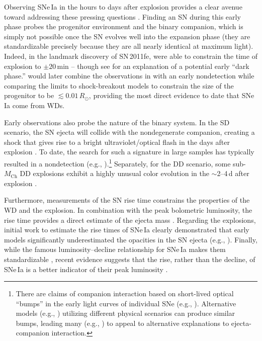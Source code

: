 \documentclass[twocolumn]{./aastex63}
\begin{document}
Observing SNe\,Ia in the hours to days after explosion provides a clear
avenue toward addressing these pressing questions \citep[e.g.,][]{Maoz14}.
Finding an SN during this early phase probes the progenitor environment and
the binary companion, which is simply not possible once the SN evolves well
into the expansion phase (they are standardizable precisely because they are
all nearly identical at maximum light). Indeed, in the landmark discovery of
SN\,2011fe, \citet{Nugent11} were able to constrain the time of explosion to
$\pm 20$\,min -- though see \citet{Piro13,Piro14} for an explanation of a
potential early ``dark phase.'' \citet{Bloom12a} would later combine the
observations in \citet{Nugent11} with an early nondetection while comparing
the limits to shock-breakout models to constrain the size of the progenitor to
be $\lesssim 0.01\,R_\odot$, providing the most direct evidence to date that
SNe\,Ia come from WDs.

Early observations also probe the nature of the binary system. In the SD
scenario, the SN ejecta will collide with the nondegenerate companion,
creating a shock that gives rise to a bright ultraviolet/optical flash in the
days after explosion \citep{Kasen10a}. To date, the search for such a
signature in large samples has typically resulted in a nondetection (e.g.,
\citealt{Hayden10,Bianco11,Ganeshalingam11}).\footnote{There are claims of
companion interaction based on short-lived optical ``bumps'' in the early
light curves of individual SNe (e.g.,
\citealt{Cao15,Marion16,Hosseinzadeh17,Dimitriadis19}). Alternative models
(e.g., \citealt{Dessart14,Piro16,Levanon17,Polin19,Magee20a}) utilizing
different physical scenarios can produce similar bumps, leading many (e.g.,
\citealt{Kromer16,Noebauer17,Miller18,Shappee18,Shappee19,Miller20a}) to
appeal to alternative explanations to ejecta-companion interaction.}
Separately, for the DD scenario, some sub-$M_\mathrm{Ch}$ DD
explosions exhibit a highly unusual color evolution in the $\sim$2--4\,d after
explosion \citep{Noebauer17,Polin19}.

Furthermore, measurements of the SN rise time constrains the properties of the
WD and the explosion. In combination with the peak bolometric luminosity, the
rise time provides a direct estimate of the ejecta mass
\citep[e.g.,][]{Arnett82,Jeffery99}. Regarding the explosions, initial work to
estimate the rise times of SNe\,Ia clearly demonstrated that early models
significantly underestimated the opacities in the SN ejecta (e.g.,
\citealt{Riess99a}). Finally, while the famous luminosity--decline
relationship for SNe\,Ia makes them standardizable \citep{Phillips93}, recent
evidence suggests that the rise, rather than the decline, of SNe\,Ia is a
better indicator of their peak luminosity \citep{Hayden19}.
\end{document}
